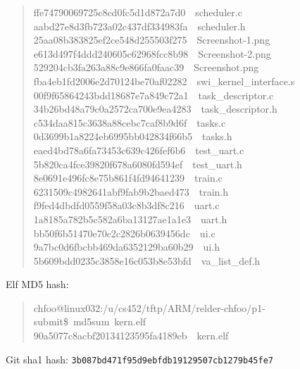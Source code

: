 \documentclass[letterpaper]{article}
\begin{document}
\begin{quote}
{ffe74790069725c8cd0fc5d1d872a7d0~~scheduler.c\\
aabd27e8d3fb723a02c437df334983fa~~scheduler.h\\
25aa08b383825ef2ce548d255503f275~~Screenshot-1.png\\
e613d497f4ddd240605c62968fcc8b98~~Screenshot-2.png\\
529204cb3fa263a88c9e866fa0faac39~~Screenshot.png\\
fba4eb1fd2006e2d70124be70af02282~~swi\_kernel\_interface.s\\
00f9f65864243bdd18687e7a849c72a1~~task\_descriptor.c\\
34b26bd48a79c0a2572ca700e9ea4283~~task\_descriptor.h\\
c534daa815c3638a88cebc7caf8b9d6f~~tasks.c\\
0d3699b1a8224eb6995bb042834f66b5~~tasks.h\\
eaed4bd78a6fa73453c639c426fef6b6~~test\_uart.c\\
5b820ca4fce39820f678a6080fd594ef~~test\_uart.h\\
8e0691e496fc8e75b861f4fd94641239~~train.c\\
6231509c4982641abf9fab9b2baed473~~train.h\\
f9fed4dbdfd0559f58a03c8b3df8c216~~uart.c\\
1a8185a782b5c582a6ba13127ae1a1e3~~uart.h\\
bb50f6b51470e70c2c2826b0639456dc~~ui.c\\
9a7bc0d6fbcbb469da6352129ba60b29~~ui.h\\
5b609bdd0235c3858e16c053b8e53bfd~~va\_list\_def.h
}
\end{quote}

Elf MD5 hash:
%
\begin{quote}{\ttfamily \raggedright \noindent
chfoo@linux032:/u/cs452/tftp/ARM/relder-chfoo/p1-submit\$~md5sum~kern.elf\\
90a5077c8acbf20134123595fa4189eb~~kern.elf
}
\end{quote}

Git sha1 hash: \texttt{3b087bd471f95d9ebfdb19129507cb1279b45fe7}
\end{document}
